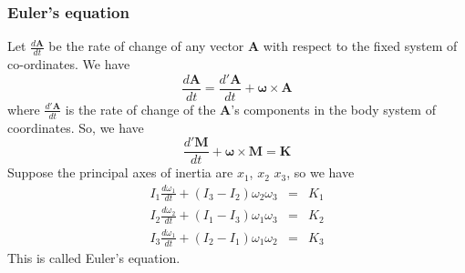 \documentclass[cyan]{elegantnote}
\begin{document}
\subsubsection{Euler's equation}
Let $\frac{d\bm{A}}{dt}$ be the rate of change of any vector $\bm{A}$ with respect to the fixed system of co-ordinates. We have
\[\frac{d\bm{A}}{dt} = \frac{d'\bm{A}}{dt} + \bm{\omega} \times \bm{A}\]
where
$\frac{d'\bm{A}}{dt}$ is the rate of change of the $\bm{A}$'s components in the body system of coordinates. So, we have
\[\frac{d'\bm{M}}{dt} + \bm{\omega} \times \bm{M} = \bm{K}\]
Suppose the principal axes of inertia are $x_1$, $x_2$ $x_3$, so we have
\begin{eqnarray}
I_1 \frac{d\omega_1}{dt} + (I_3-I_2)\omega_2\omega_3 &=& K_1 \nonumber \\
I_2 \frac{d\omega_2}{dt} + (I_1-I_3)\omega_1\omega_3 &=& K_2 \nonumber \\
I_3 \frac{d\omega_1}{dt} + (I_2-I_1)\omega_1\omega_2 &=& K_3 \nonumber
\end{eqnarray}
This is called Euler's equation.
\end{document}
